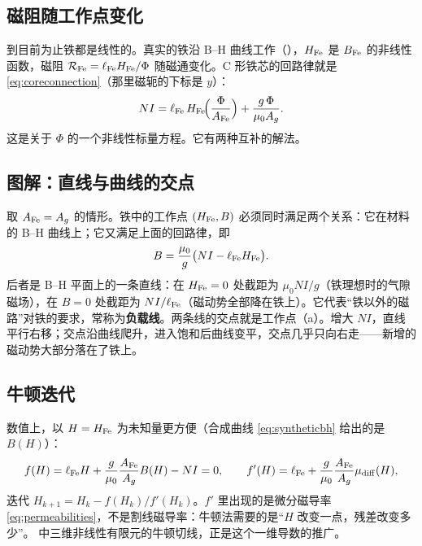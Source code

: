 \subsection{磁阻随工作点变化}
到目前为止铁都是线性的。真实的铁沿 B--H 曲线工作（），$H_{\rm Fe}$ 是 $B_{\rm Fe}$ 的非线性函数，磁阻 $\mathcal R_{\rm Fe}=\ell_{\rm Fe}H_{\rm Fe}/\Phi$ 随磁通变化。C 形铁芯的回路律就是\eqref{eq:coreconnection}（那里磁轭的下标是 $y$）：
\begin{equation}
NI=\ell_{\rm Fe}\,H_{\rm Fe}\!\Bigl(\frac{\Phi}{A_{\rm Fe}}\Bigr)+\frac{g\,\Phi}{\mu_0A_g}.
\end{equation}
这是关于 $\Phi$ 的一个非线性标量方程。它有两种互补的解法。

\subsection{图解：直线与曲线的交点}
取 $A_{\rm Fe}=A_g$ 的情形。铁中的工作点 $(H_{\rm Fe},B)$ 必须同时满足两个关系：它在材料的 B--H 曲线上；它又满足上面的回路律，即
\begin{equation}
B=\frac{\mu_0}{g}\bigl(NI-\ell_{\rm Fe}H_{\rm Fe}\bigr).
\end{equation}
后者是 B--H 平面上的一条直线：在 $H_{\rm Fe}=0$ 处截距为 $\mu_0NI/g$（铁理想时的气隙磁场），在 $B=0$ 处截距为 $NI/\ell_{\rm Fe}$（磁动势全部降在铁上）。它代表“铁以外的磁路”对铁的要求，常称为\textbf{负载线}。两条线的交点就是工作点（a）。增大 $NI$，直线平行右移；交点沿曲线爬升，进入饱和后曲线变平，交点几乎只向右走——新增的磁动势大部分落在了铁上。

\subsection{牛顿迭代}
数值上，以 $H=H_{\rm Fe}$ 为未知量更方便（合成曲线 \eqref{eq:syntheticbh} 给出的是 $B(H)$）：
\begin{equation}
f(H)=\ell_{\rm Fe}H+\frac{g}{\mu_0}\frac{A_{\rm Fe}}{A_g}B(H)-NI=0,\qquad
f'(H)=\ell_{\rm Fe}+\frac{g}{\mu_0}\frac{A_{\rm Fe}}{A_g}\mu_{\rm diff}(H),
\end{equation}
迭代 $H_{k+1}=H_k-f(H_k)/f'(H_k)$。$f'$ 里出现的是微分磁导率 \eqref{eq:permeabilities}，不是割线磁导率：牛顿法需要的是“$H$ 改变一点，残差改变多少”。 中三维非线性有限元的牛顿切线，正是这个一维导数的推广。

